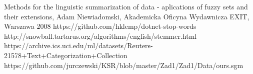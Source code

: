 \documentclass{classrep}
\begin{document}
\begin{thebibliography}{}
Methods for the linguistic summarization of data - aplications of fuzzy sets and their extensions, Adam Niewiadomski, Akademicka Oficyna Wydawnicza EXIT, Warszawa 2008
https://github.com/hklemp/dotnet-stop-words
http://snowball.tartarus.org/algorithms/english/stemmer.html
https://archive.ics.uci.edu/ml/datasets/Reuters-21578+Text+Categorization+Collection
https://github.com/jurczewski/KSR/blob/master/Zad1/Zad1/Data/ours.sgm
\end{thebibliography}
\end{document}
